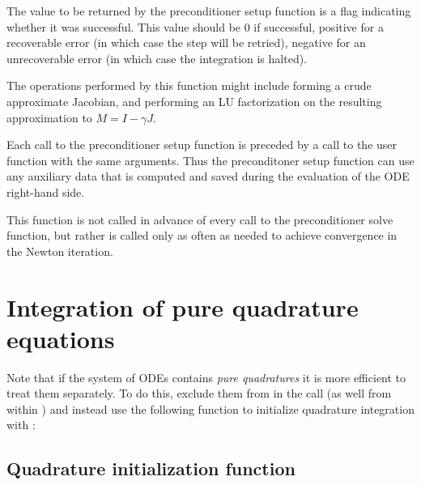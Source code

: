 {
  The value to be returned by the preconditioner setup function is a flag indicating 
  whether it was successful.  This value should be $0$ if successful, 
  positive for a recoverable error (in which case the step will be retried),     
  negative for an unrecoverable error (in which case the integration is halted). 
}
{
  The operations performed by this function might include forming a crude 
  approximate Jacobian, and performing an LU factorization on the resulting            
  approximation to $M=I - \gamma J$.

  Each call to the preconditioner setup function is preceded by a call to     
  the  user function with the same  arguments.  
  Thus the preconditoner setup function can use any auxiliary data that is 
  computed and saved during the evaluation of the ODE right-hand side.
  
  This function is not called in advance of every call to the preconditioner solve
  function, but rather is called only as often as needed to achieve convergence in the
  Newton iteration. 
}
\section{Integration of pure quadrature equations}

Note that if the system of ODEs contains {\em pure quadratures} it is more efficient
to treat them separately. To do this, exclude them from  in the 
 call (as well from within ) and instead use the following 
function to initialize quadrature integration with {\cvodes}:


\subsection{Quadrature initialization function}\label{sss:cvodequadmalloc}

